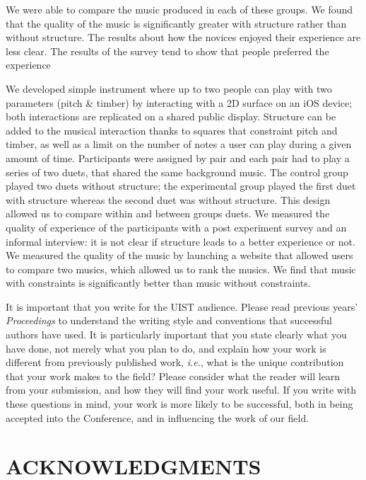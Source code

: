 \documentclass{article}
\begin{document}
We were able to compare the music produced in each of these groups. We found that the quality of the music is significantly greater with structure rather than without structure. The results about how the novices enjoyed their experience are less clear. The results of the survey tend to show that people preferred the experience 

We developed simple instrument where up to two people can play with two parameters (pitch \& timber) by interacting with a 2D surface on an iOS device; both interactions are replicated on a shared public display. Structure can be added to the musical interaction thanks to squares that constraint pitch and timber, as well as a limit on the number of notes a user can play during a given amount of time. Participants were assigned by pair and each pair had to play a series of two duets, that shared the same background music. The control group played two duets without structure; the experimental group played the first duet with structure whereas the second duet was without structure. This design allowed us to compare within and between groups duets. We measured the quality of experience of the participants with a post experiment survey and an informal interview: it is not clear if structure leads to a better experience or not. We measured the quality of the music by launching a website that allowed users to compare two musics, which allowed us to rank the musics. We find that music with constraints is significantly better than music without constraints.


It is important that you write for the UIST audience.  Please read previous years’
{\em Proceedings} to understand the writing style and conventions that successful 
authors have used.  It is particularly important that you state clearly what you 
have done, not merely what you plan to do, and explain how your work is
different from previously published work, \emph{i.e.}, what is the unique contribution
that your work makes to the field?  Please consider what the reader will learn
from your submission, and how they will find your work useful.  If you write with
these questions in mind, your work is more likely to be successful, both in being
accepted into the Conference, and in influencing the work of our field.




\section{ACKNOWLEDGMENTS}
\end{document}
